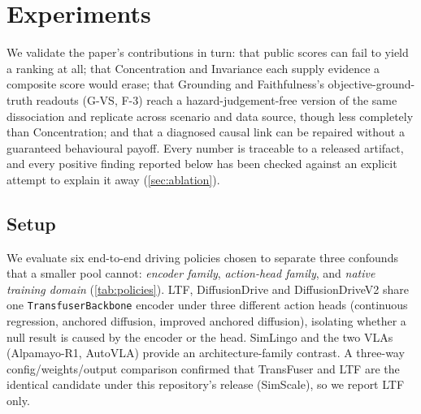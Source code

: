 \section{Experiments}
\label{sec:experiments}

We validate the paper's contributions in turn: that public scores can fail to yield a
ranking at all; that Concentration and Invariance each supply evidence a composite score
would erase; that Grounding and Faithfulness's objective-ground-truth readouts (G-VS,
F-3) reach a hazard-judgement-free version of the same dissociation and replicate across
scenario and data source, though less completely than Concentration; and that a
diagnosed causal link can be repaired without a guaranteed behavioural payoff. Every
number is traceable to a released artifact, and every positive finding reported below
has been checked against an explicit attempt to explain it away
(\cref{sec:ablation}).

\subsection{Setup}
\label{sec:setup}

We evaluate six end-to-end driving policies chosen to separate three confounds that a
smaller pool cannot: \emph{encoder family}, \emph{action-head family}, and \emph{native
training domain} (\cref{tab:policies}). LTF, DiffusionDrive and DiffusionDriveV2 share
one \texttt{TransfuserBackbone} encoder under three different action heads (continuous
regression, anchored diffusion, improved anchored diffusion), isolating whether a null
result is caused by the encoder or the head. SimLingo and the two VLAs (Alpamayo-R1,
AutoVLA) provide an architecture-family contrast. A three-way config/weights/output
comparison confirmed that TransFuser and LTF are the identical candidate under this
repository's release (SimScale), so we report LTF only.

\begin{table}[t]
\centering
\caption{Policies under test. $^\dagger$Domain from checkpoint metadata, not independently verified.}
\label{tab:policies}
\scriptsize
{}
\end{table}

